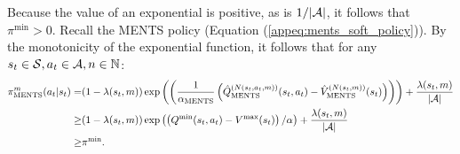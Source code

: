 \begin{proofoutline}
                Because the value of an exponential is positive, as is $1/|\mathcal{A}|$, it follows that $\pi^{\min}>0.$ Recall the MENTS policy (Equation (\ref{appeq:ments_soft_policy})). By the monotonicity of the exponential function, it follows that for any $s_t\in\mathcal{S}, a_t\in\mathcal{A}, n\in\mathbb{N}$:
                \begin{align}
                    {\pi^{m}_{{\textnormal{MENTS}}}}(a_t|s_t) 
                        =& (1-\lambda(s_t,m))\exp\left(\left(\frac{1}{{\alpha_{{\textnormal{MENTS}}}}}\left({\hat{Q}^{(N(s_t,a_t,m))}_{{\textnormal{MENTS}}}}(s_t,a_t)-{\hat{V}^{(N(s_t,m))}_{{\textnormal{MENTS}}}}(s_t)\right)\right)\right) 
                            + \frac{\lambda(s_t,m)}{|\mathcal{A}|} \\
                        \geq& (1-\lambda(s_t,m))\exp\left(\left(Q^{\min}(s_t,a_t)-V^{\max}(s_t)\right)/\alpha\right) 
                            + \frac{\lambda(s_t,m)}{|\mathcal{A}|} \\
                        \geq& \pi^{\min}.
                \end{align}
            \end{proofoutline}
                
                






